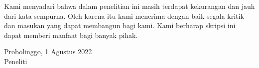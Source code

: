 Kami menyadari bahwa dalam penelitian ini masih terdapat kekurangan dan jauh dari kata sempurna. Oleh karena itu kami menerima dengan baik segala kritik dan masukan yang dapat membangun bagi kami. Kami berharap skripsi ini dapat memberi manfaat bagi banyak pihak.

\begin{flushright}
Probolinggo, 1 Agustus 2022\\
Peneliti
\end{flushright}